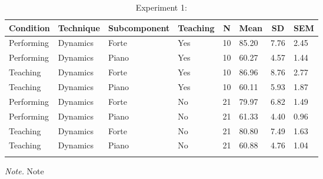 \documentclass[
  man,floatsintext]{apa6}
\begin{document}
\begin{table}[tbp]

\begin{center}
\begin{threeparttable}

\caption{\label{tab:dyn-teaching-desc-1}Experiment 1:}

\begin{tabular}{llllllll}
\toprule
Condition & \multicolumn{1}{c}{Technique} & \multicolumn{1}{c}{Subcomponent} & \multicolumn{1}{c}{Teaching} & \multicolumn{1}{c}{N} & \multicolumn{1}{c}{Mean} & \multicolumn{1}{c}{SD} & \multicolumn{1}{c}{SEM}\\
\midrule
Performing & Dynamics & Forte & Yes & 10 & 85.20 & 7.76 & 2.45\\
Performing & Dynamics & Piano & Yes & 10 & 60.27 & 4.57 & 1.44\\
Teaching & Dynamics & Forte & Yes & 10 & 86.96 & 8.76 & 2.77\\
Teaching & Dynamics & Piano & Yes & 10 & 60.11 & 5.93 & 1.87\\
Performing & Dynamics & Forte & No & 21 & 79.97 & 6.82 & 1.49\\
Performing & Dynamics & Piano & No & 21 & 61.33 & 4.40 & 0.96\\
Teaching & Dynamics & Forte & No & 21 & 80.80 & 7.49 & 1.63\\
Teaching & Dynamics & Piano & No & 21 & 60.88 & 4.76 & 1.04\\
\bottomrule
\addlinespace
\end{tabular}

\begin{tablenotes}[para]
\normalsize{\textit{Note.} Note}
\end{tablenotes}

\end{threeparttable}
\end{center}

\end{table}
\end{document}
